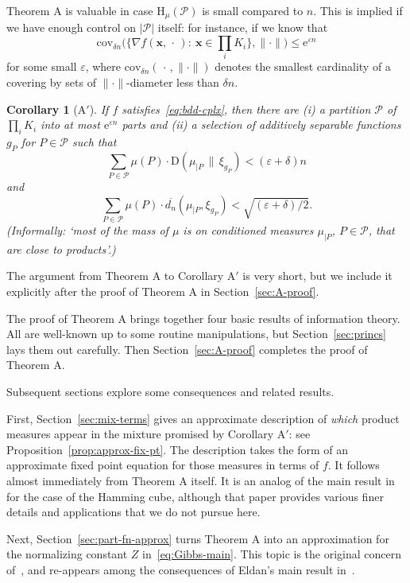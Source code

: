\documentclass[aop,preprint]{imsart}
\newtheorem*{cor*}{Corollary}
\theoremstyle{remark}
\renewcommand{\bf}[1]{\boldsymbol{#1}}
\renewcommand{\rm}[1]{\mathrm{#1}}
\renewcommand{\cal}[1]{\mathcal{#1}}
\newcommand{\rmH}{\mathrm{H}}
\newcommand{\rme}{\mathrm{e}}
\renewcommand{\P}{\mathcal{P}}
\newcommand{\eps}{\varepsilon}
\newcommand{\ol}[1]{\overline{#1}}
\newcommand{\rmD}{\mathrm{D}}
\begin{document}
Theorem A is valuable in case $\rmH_\mu(\cal{P})$ is small compared to $n$.  This is implied if we have enough control on $|\P|$ itself: for instance, if we know that
\begin{equation}\label{eq:bdd-cplx}
\rm{cov}_{\delta n}\Big(\Big\{\nabla f(\bf{x},\,\cdot\,):\ \bf{x} \in \prod_i K_i\Big\},\|\cdot\|\Big) \leq \rme^{\eps n}
\end{equation}
for some small $\eps$, where $\rm{cov}_{\delta n}(\,\cdot\,,\|\cdot\|)$ denotes the smallest cardinality of a covering by sets of $\|\cdot\|$-diameter less than $\delta n$.

\begin{cor*}[A$'$]
	If $f$ satisfies~\eqref{eq:bdd-cplx}, then there are (i) a partition $\cal{P}$ of $\prod_i K_i$ into at most $\rme^{\eps n}$ parts and (ii) a selection of additively separable functions $g_P$ for $P \in \cal{P}$ such that
			\[\sum_{P \in \cal{P}}\mu(P)\cdot \rmD(\mu_{|P}\,\|\,\xi_{g_P}) < (\eps + \delta)n\]
and
		\[\sum_{P \in \cal{P}}\mu(P)\cdot \ol{d_n}(\mu_{|P},\xi_{g_P}) < \sqrt{(\eps + \delta)/2}.\]
		(Informally: `most of the mass of $\mu$ is on conditioned measures $\mu_{|P}$, $P \in \cal{P}$, that are close to products'.)
\end{cor*}

The argument from Theorem A to Corollary A$'$ is very short, but we include it explicitly after the proof of Theorem A in Section~\ref{sec:A-proof}.

The proof of Theorem A brings together four basic results of information theory.  All are well-known up to some routine manipulations, but Section~\ref{sec:princs} lays them out carefully.  Then Section~\ref{sec:A-proof} completes the proof of Theorem A.

Subsequent sections explore some consequences and related results.

First, Section~\ref{sec:mix-terms} gives an approximate description of \emph{which} product measures appear in the mixture promised by Corollary A$'$: see Proposition~\ref{prop:approx-fix-pt}.  The description takes the form of an approximate fixed point equation for those measures in terms of $f$.  It follows almost immediately from Theorem A itself. It is an analog of the main result in~\cite{EldGro18} for the case of the Hamming cube, although that paper provides various finer details and applications that we do not pursue here.

Next, Section~\ref{sec:part-fn-approx} turns Theorem A into an approximation for the normalizing constant $Z$ in~\eqref{eq:Gibbs-main}.  This topic is the original concern of~\cite{ChaDem16}, and re-appears among the consequences of Eldan's main result in~\cite{Eld--GWcomp}.
\end{document}

